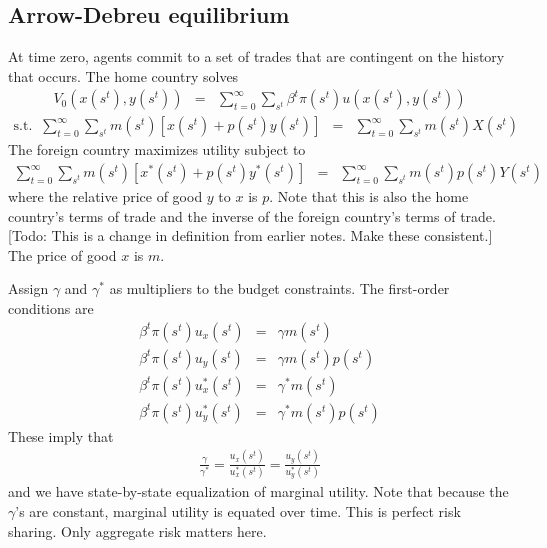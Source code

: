 \documentclass[11pt,pdftex,twoside,letterpaper]{exam}
\begin{document}
\subsection{Arrow-Debreu equilibrium}
 At time zero, agents commit to a set of trades that are contingent on the history that occurs. The home country solves
 \begin{eqnarray}
  V_0\left(x\left(s^t\right), y\left(s^t\right)\right) &=&  \sum_{t=0}^\infty \sum_{s^t} \beta^t \pi(s^t)u\left( x\left(s^t\right), y\left(s^t\right) \right)
\end{eqnarray}
\begin{eqnarray}
  \textrm{s.t.} \;\; \sum_{t=0}^\infty \sum_{s^t} m(s^t)\left[ x(s^t)+p(s^t)y(s^t)  \right]&=& \sum_{t=0}^\infty \sum_{s^t} m(s^t) X(s^t)
\end{eqnarray}
The foreign country maximizes utility subject to
\begin{eqnarray}
  \sum_{t=0}^\infty \sum_{s^t} m(s^t)\left[ x^*(s^t)+p(s^t)y^*(s^t)  \right]&=& \sum_{t=0}^\infty \sum_{s^t} m(s^t) p(s^t)Y(s^t)
\end{eqnarray}
where the relative price of good $y$ to $x$ is $p$. Note that this is also the home country's terms of trade and the inverse of the foreign country's terms of trade. [Todo: This is a change in definition from earlier notes. Make these consistent.] The price of good $x$ is $m$.

Assign $\gamma$ and $\gamma^*$ as multipliers to the budget constraints. The first-order conditions are
\begin{eqnarray}
  \beta^t\pi(s^t)u_x(s^t) &=& \gamma m(s^t) \\
  \beta^t\pi(s^t)u_y(s^t) &=& \gamma m(s^t) p(s^t)\\
  \beta^t\pi(s^t)u_x^*(s^t) &=& \gamma^* m(s^t) \\
  \beta^t\pi(s^t)u_y^*(s^t) &=& \gamma^* m(s^t) p(s^t)
\end{eqnarray}
These imply that
\begin{eqnarray}
  \frac{\gamma}{\gamma^*} =\frac{u_x(s^t)}{u_x^*(s^t)} = \frac{u_y(s^t)}{u_y^*(s^t)}
\end{eqnarray}
and we have state-by-state equalization of marginal utility. Note that because the $\gamma$'s are constant, marginal utility is equated over time. This is perfect risk sharing. Only aggregate risk matters here.
\end{document}
